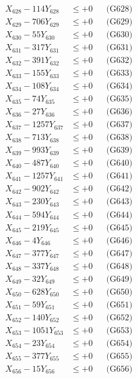 \documentclass[a4paper,10pt]{article}
\begin{document}
{\begin{align}
X_{628} - 114Y_{628} &\leq +0 && \text{(G628)} \\
X_{629} - 706Y_{629} &\leq +0 && \text{(G629)} \\
X_{630} - 55Y_{630} &\leq +0 && \text{(G630)} \\
\allowbreak
X_{631} - 317Y_{631} &\leq +0 && \text{(G631)} \\
X_{632} - 391Y_{632} &\leq +0 && \text{(G632)} \\
X_{633} - 155Y_{633} &\leq +0 && \text{(G633)} \\
X_{634} - 108Y_{634} &\leq +0 && \text{(G634)} \\
X_{635} - 74Y_{635} &\leq +0 && \text{(G635)} \\
X_{636} - 27Y_{636} &\leq +0 && \text{(G636)} \\
X_{637} - 1257Y_{637} &\leq +0 && \text{(G637)} \\
X_{638} - 713Y_{638} &\leq +0 && \text{(G638)} \\
X_{639} - 993Y_{639} &\leq +0 && \text{(G639)} \\
X_{640} - 487Y_{640} &\leq +0 && \text{(G640)} \\
\allowbreak
X_{641} - 1257Y_{641} &\leq +0 && \text{(G641)} \\
X_{642} - 902Y_{642} &\leq +0 && \text{(G642)} \\
X_{643} - 230Y_{643} &\leq +0 && \text{(G643)} \\
X_{644} - 594Y_{644} &\leq +0 && \text{(G644)} \\
X_{645} - 219Y_{645} &\leq +0 && \text{(G645)} \\
X_{646} - 4Y_{646} &\leq +0 && \text{(G646)} \\
X_{647} - 377Y_{647} &\leq +0 && \text{(G647)} \\
X_{648} - 337Y_{648} &\leq +0 && \text{(G648)} \\
X_{649} - 32Y_{649} &\leq +0 && \text{(G649)} \\
X_{650} - 628Y_{650} &\leq +0 && \text{(G650)} \\
\allowbreak
X_{651} - 59Y_{651} &\leq +0 && \text{(G651)} \\
X_{652} - 140Y_{652} &\leq +0 && \text{(G652)} \\
X_{653} - 1051Y_{653} &\leq +0 && \text{(G653)} \\
X_{654} - 23Y_{654} &\leq +0 && \text{(G654)} \\
X_{655} - 377Y_{655} &\leq +0 && \text{(G655)} \\
X_{656} - 15Y_{656} &\leq +0 && \text{(G656)} \\

\end{align}}
\end{document}
